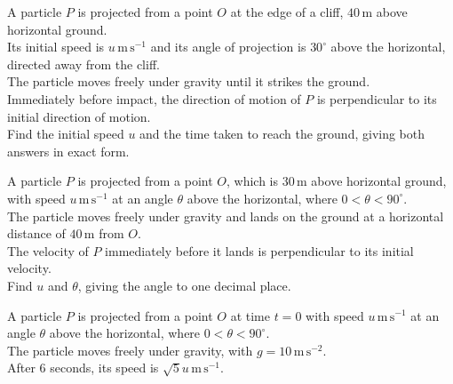 \documentclass[leqno]{article}
\begin{document}
\djsFrontMatter
\begin{enumerate}[
  label=\textbf{\arabic*.},
  leftmargin=*,
  topsep=0pt,
  partopsep=0pt,
  parsep=0pt
]

\questionitem

A particle $P$ is projected from a point $O$ at the edge of a cliff, $40\,\mathrm{m}$ above horizontal ground. \\
Its initial speed is $u\,\mathrm{m\,s^{-1}}$ and its angle of projection is $30^\circ$ above the horizontal, directed away from the cliff. \\
The particle moves freely under gravity until it strikes the ground. \\

Immediately before impact, the direction of motion of $P$ is perpendicular to its initial direction of motion. \\

Find the initial speed $u$ and the time taken to reach the ground, giving both answers in exact form.  \\

\newpage

\questionitem

A particle $P$ is projected from a point $O$, which is $30\,\mathrm{m}$ above horizontal ground, with speed $u\,\mathrm{m\,s^{-1}}$ at an angle $\theta$ above the horizontal, where $0<\theta<90^\circ$. \\
The particle moves freely under gravity and lands on the ground at a horizontal distance of $40\,\mathrm{m}$ from $O$. \\

The velocity of $P$ immediately before it lands is perpendicular to its initial velocity. \\

Find $u$ and $\theta$, giving the angle to one decimal place.  \\

\newpage

\questionitem

A particle $P$ is projected from a point $O$ at time $t=0$ with speed $u\,\mathrm{m\,s^{-1}}$ at an angle $\theta$ above the horizontal, where $0<\theta<90^\circ$. \\
The particle moves freely under gravity, with $g=10\,\mathrm{m\,s^{-2}}$. \\
After $6$ seconds, its speed is $\sqrt{5}u\,\mathrm{m\,s^{-1}}$. \\


\end{enumerate}
\end{document}
